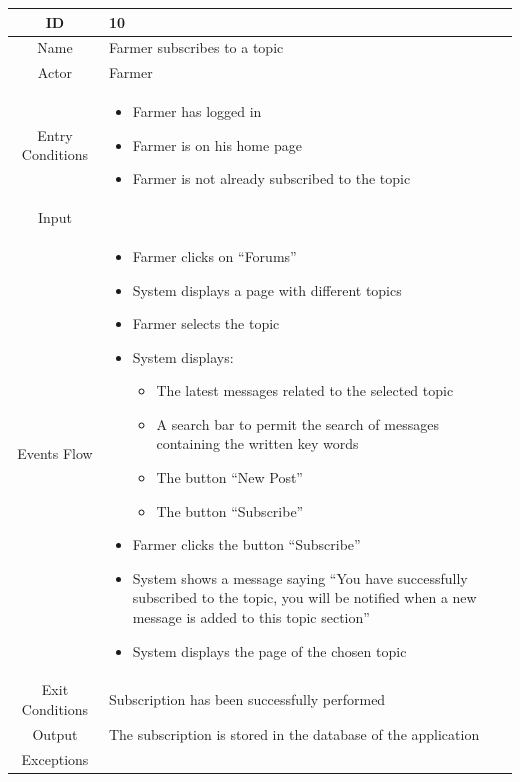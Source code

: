 \documentclass{article}
\begin{document}
\begin{center}
    \begin{longtable}{|c| p{10cm}|} 
        \hline
            ID & 10 \\
        \hline
            Name & Farmer subscribes to a topic\\
        \hline
            Actor & Farmer \\
        \hline
            Entry Conditions & 
                                \begin{itemize}
                                    \item Farmer has logged in
                                    \item Farmer is on his home page
                                    \item Farmer is not already subscribed to the topic
                                \end{itemize}\\
        \hline
            Input & \\
        \hline
            Events Flow &   \begin{itemize}
                                \item Farmer clicks on “Forums”
                                \item System displays a page with different topics  
                                \item Farmer selects the topic
                                \item System displays:
                                            \begin{itemize}
                                                \item The latest messages related to the selected topic
                                                \item A search bar to permit the search of messages containing the written key words
                                                \item The button “New Post” 
                                                \item The button “Subscribe”
                                            \end{itemize}
                                \item Farmer clicks the button “Subscribe”
                                \item System shows a message saying “You have successfully subscribed to the topic, you will be notified when a new message is added to this topic section” 
                                \item System displays the page of the chosen topic
                            \end{itemize} \\
        \hline
            Exit Conditions & Subscription has been successfully performed\\
        \hline
            Output & The subscription is stored in the database of the application\\
        \hline
            Exceptions & \\
        \hline
    \end{longtable}
    

\end{center}
\end{document}

